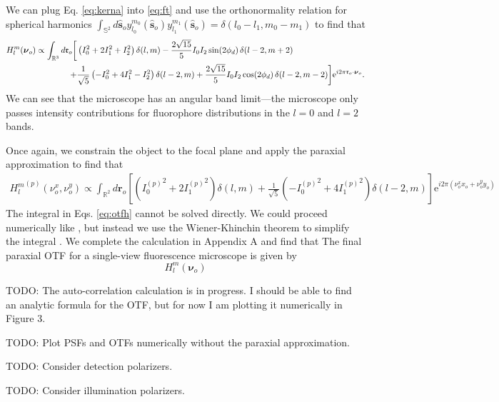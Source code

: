 \documentclass[11pt]{article}
\newcommand{\me}{\mathrm{e}}
\providecommand{\mb}[1]{\mathbf{#1}}
\providecommand{\ro}[1]{\mathbf{\mathfrak{r}}_o}
\providecommand{\so}[1]{\mathbf{\hat{s}}_o}
\providecommand{\bs}[1]{\boldsymbol{#1}}
\begin{document}
We can plug Eq. \ref{eq:kerna} into \ref{eq:ft} and use the orthonormality
relation for spherical harmonics $\int_{\mathbb{S}^2}d\so{} y_{l_0}^{m_0}(\so{})y_{l_1}^{m_1}(\so{}) = \delta(l_0 - l_1, m_0 - m_1)$ to find that
\begin{equation}
  \begin{split}
  H_l^m(\bs{\nu}_o) \propto \int_{\mathbb{R}^3}d\ro{}  \bigg[&\left(I_0^2 + 2I_1^2 + I_2^2\right) \delta(l, m) - \frac{2\sqrt{15}}{5}I_0I_2\sin(2\phi_d)\thinspace \delta(l-2, m+2)\\ +& \frac{1}{\sqrt{5}}\left(-I_0^2 + 4I_1^2 - I_2^2\right) \delta(l-2, m) +\frac{2\sqrt{15}}{5}I_0I_2\cos(2\phi_d) \thinspace \delta(l-2, m-2)\bigg]\me^{i 2\pi \ro{}\cdot\bs{\nu}_o}.\label{eq:otf}
\end{split}
\end{equation}
We can see that the microscope has an angular band limit---the microscope only
passes intensity contributions for fluorophore distributions in the $l=0$ and
$l=2$ bands.

Once again, we constrain the object to the focal plane and apply the paraxial
approximation to find that
\begin{align}
  {H_l^m}^{(p)}(\nu_o^x, \nu_o^y) \propto \int_{\mathbb{R}^2}d\mb{r}_o\left[\left({I_0^{(p)}}^2 + 2{I_1^{(p)}}^2\right)\delta(l, m) + \frac{1}{\sqrt{5}}\left(-{I_0^{(p)}}^2 + 4{I_1^{(p)}}^2\right)\delta(l-2, m)\right]  \me^{i 2\pi(\nu_o^xx_o + \nu_o^yy_o)}\label{eq:otfh}
\end{align}
The integral in Eqs. \ref{eq:otfh} cannot be solved directly. We could proceed
numerically like \cite{backer2014}, but instead we use the Wiener-Khinchin
theorem to simplify the integral \cite{goodman1996, papoulis2002}. We complete
the calculation in Appendix A and find that
The final paraxial OTF for a single-view fluorescence microscope is
given by
\begin{equation}
  H_l^m(\bs{\nu}_o)
\end{equation}

TODO: The auto-correlation calculation is in progress. I should be able to find an
analytic formula for the OTF, but for now I am plotting it numerically in Figure 3.

TODO: Plot PSFs and OTFs numerically without the paraxial approximation.

TODO: Consider detection polarizers.

TODO: Consider illumination polarizers.
\end{document}
